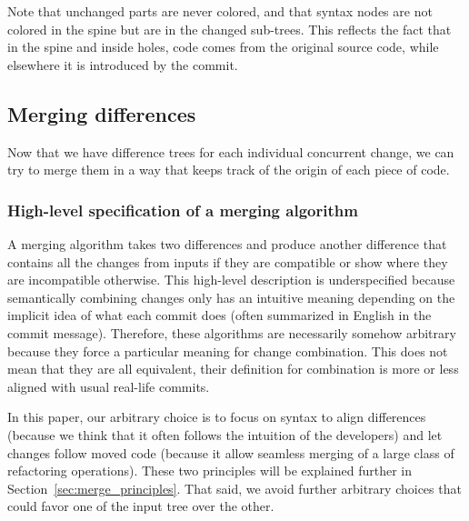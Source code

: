\documentclass[a4paper,11pt]{article}
\newcommand\yrg[1]{}%
\newcommand\gb[1]{}%
\begin{document}
Note that unchanged parts are never colored, and that syntax nodes are not colored in the spine but are in the changed sub-trees. This reflects the fact that in the spine and inside holes, code comes from the original source code, while elsewhere it is introduced by the commit. \yrg{I am wondering if you should not use the background color to colorize terms...}\gb{Combining background would be hard, while in the overview example I double strike-trough and give distinct colors inside changes}

\subsection{Merging differences}
Now that we have difference trees for each individual concurrent
change, we can try to merge them in a way that keeps track of the
origin of each piece of code.

\subsubsection{High-level specification of a merging algorithm}
A merging algorithm takes two differences and produce another difference that contains all the changes from inputs if they are compatible or show where they are incompatible otherwise. This high-level description is underspecified because semantically combining changes only has an intuitive meaning depending on the implicit idea of what each commit does (often summarized in English in the commit message). Therefore, these algorithms are necessarily somehow arbitrary because they force a particular meaning for change combination. This does not mean that they are all equivalent, their definition for combination is more or less aligned with usual real-life commits.

In this paper, our arbitrary choice is to focus on syntax to align differences (because we think that it often follows the intuition of the developers) and let changes follow moved code (because it allow seamless merging of a large class of refactoring operations). These two principles will be explained further in Section~\ref{sec:merge_principles}. That said, we avoid further arbitrary choices that could favor one of the input tree over the other.

\yrg{At this point, you must discuss what are
  the design principles that guided your work to get a form of
  syntactical merge which seems to take no arbitrary choice at the
  level of syntax...}\gb{Hmm, you mean low level principles like merge common spine or push meta-variables down the deletion trees? This seems too 'low-level' for this part...}
\end{document}
